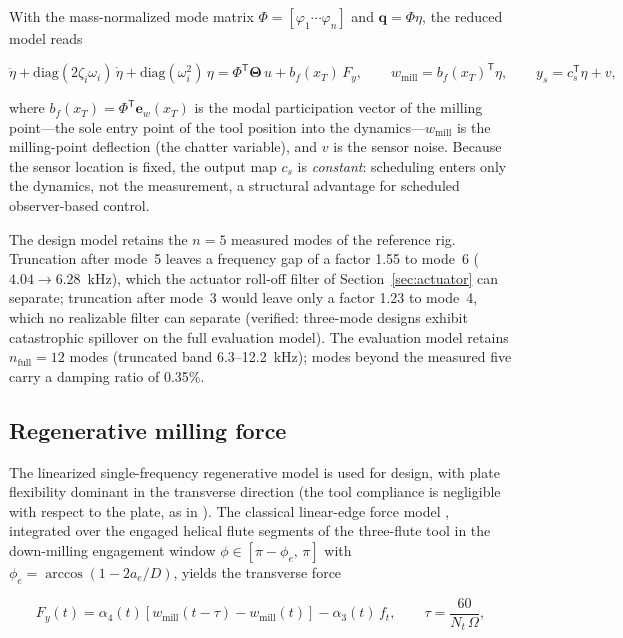 \documentclass[preprint,12pt]{elsarticle}
\newcommand{\wmill}{w_{\mathrm{mill}}}
\newcommand{\T}{\mathsf{T}}
\begin{document}
With the mass-normalized mode matrix
$\Phi = [\varphi_1 \cdots \varphi_n]$ and $\mathbf{q} = \Phi \eta$, the
reduced model reads

\begin{equation}
\label{eq:modal}
\ddot{\eta} + \mathrm{diag}(2 \zeta_i \omega_i)\, \dot{\eta}
+ \mathrm{diag}(\omega_i^2)\, \eta
= \Phi^{\T} \boldsymbol{\Theta}\, u + b_f(x_T)\, F_y,
\qquad
\wmill = b_f(x_T)^{\T} \eta,
\qquad
y_s = c_s^{\T} \eta + v,
\end{equation}

where $b_f(x_T) = \Phi^{\T} \mathbf{e}_w(x_T)$ is the modal
participation vector of the milling point---the sole entry point of the
tool position into the dynamics---$\wmill$ is the milling-point
deflection (the chatter variable), and $v$ is the sensor noise. Because
the sensor location is fixed, the output map $c_s$ is
\emph{constant}: scheduling enters only the dynamics, not the
measurement, a structural advantage for scheduled observer-based
control.

The design model retains the $n = 5$ measured modes of the reference
rig. Truncation after mode~5 leaves a frequency gap of a factor 1.55 to
mode~6 ($4.04 \rightarrow 6.28$~kHz), which the actuator roll-off filter
of Section~\ref{sec:actuator} can separate; truncation after mode~3
would leave only a factor 1.23 to mode~4, which no realizable filter can
separate (verified: three-mode designs exhibit catastrophic spillover on
the full evaluation model). The evaluation model retains
$n_{\mathrm{full}} = 12$ modes (truncated band 6.3--12.2~kHz); modes
beyond the measured five carry a damping ratio of 0.35\%.

\subsection{Regenerative milling force}
\label{sec:force}

The linearized single-frequency regenerative model is used for design,
with plate flexibility dominant in the transverse direction (the tool
compliance is negligible with respect to the plate, as in
\cite{du2024robust}). The classical linear-edge force model
\cite{altintas2012manufacturing}, integrated over the engaged helical
flute segments of the three-flute tool in the down-milling engagement
window $\phi \in [\pi - \phi_e,\, \pi]$ with
$\phi_e = \arccos(1 - 2 a_e / D)$, yields the transverse force

\begin{equation}
\label{eq:force}
F_y(t) = \alpha_4(t) \left[ \wmill(t - \tau) - \wmill(t) \right]
- \alpha_3(t)\, f_t,
\qquad
\tau = \frac{60}{N_t\, \Omega},
\end{equation}
\end{document}
